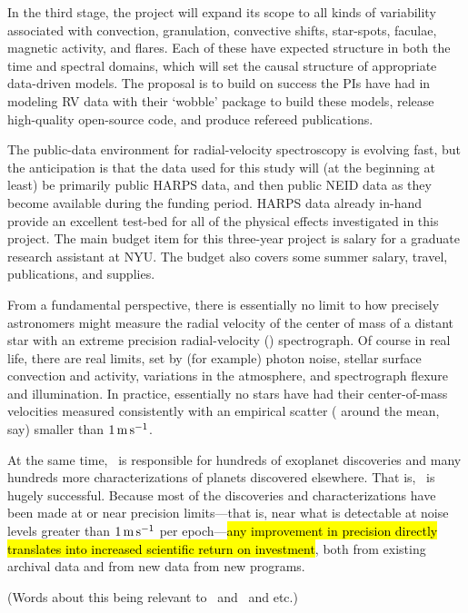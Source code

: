 \documentclass[12pt, fullpage, letterpaper]{article}
\begin{document}
In the third stage, the project will expand its scope to all kinds of
variability associated with convection, granulation, convective
shifts, star-spots, faculae, magnetic activity, and flares. Each of
these have expected structure in both the time and spectral domains,
which will set the causal structure of appropriate data-driven
models. The proposal is to build on success the PIs have had in
modeling RV data with their ‘wobble’ package to build these models,
release high-quality open-source code, and produce refereed
publications.

The public-data environment for radial-velocity spectroscopy is
evolving fast, but the anticipation is that the data used for this
study will (at the beginning at least) be primarily public HARPS data,
and then public NEID data as they become available during the funding
period. HARPS data already in-hand provide an excellent test-bed for
all of the physical effects investigated in this project. The main
budget item for this three-year project is salary for a graduate
research assistant at NYU. The budget also covers some summer salary,
travel, publications, and supplies.


\noindent
From a fundamental perspective, there is essentially no limit to how
precisely astronomers might measure the radial velocity of the center of mass
of a distant star with an extreme precision radial-velocity (\EPRV) spectrograph.
Of course in real life, there are real limits, set
by (for example) photon noise, stellar surface convection and activity,
variations in the atmosphere, and spectrograph flexure and illumination. In practice,
essentially no stars have had their center-of-mass velocities measured
consistently with an empirical scatter ( around the mean,
say) smaller than $1\,{\mathrm{m\,s^{-1}}}$.

At the same time, \EPRV\ is responsible for hundreds of 
exoplanet discoveries and many hundreds more 
characterizations of planets
discovered elsewhere. That is, \EPRV\ is hugely successful.
Because most of the discoveries and characterizations have been made
at or near precision limits---that is, near what is detectable at noise levels
greater than $1\,{\mathrm{m\,s^{-1}}}$ per epoch---\hl{any improvement in precision directly
translates into increased scientific return on investment},
both from existing archival data and from new data from new programs.

(Words about this being relevant to \NASA\ and \XRP\ and etc.)
\end{document}
